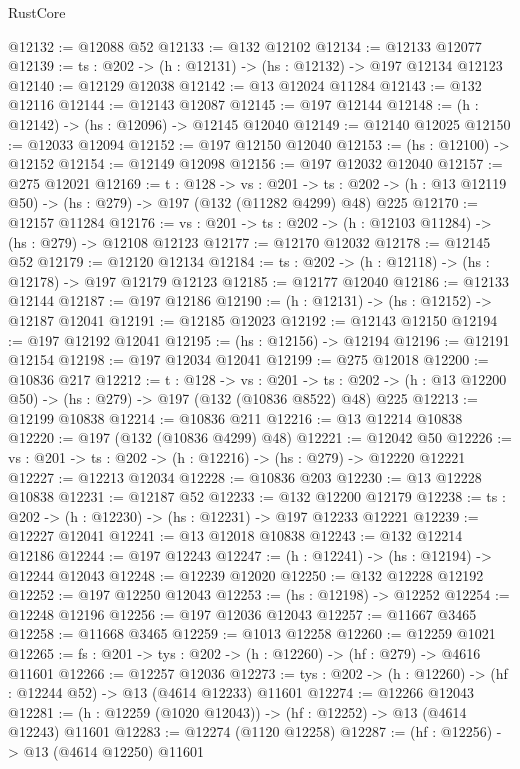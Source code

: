 \begin{lexlean}{RustCore}
\begin{coremodule}
@12132 := @12088 @52
@12133 := @132 @12102
@12134 := @12133 @12077
@12139 := {ts : @202} -> (h : @12131) -> (hs : @12132) -> @197 @12134 @12123
@12140 := @12129 @12038
@12142 := @13 @12024 @11284
@12143 := @132 @12116
@12144 := @12143 @12087
@12145 := @197 @12144
@12148 := (h : @12142) -> (hs : @12096) -> @12145 @12040
@12149 := @12140 @12025
@12150 := @12033 @12094
@12152 := @197 @12150 @12040
@12153 := (hs : @12100) -> @12152
@12154 := @12149 @12098
@12156 := @197 @12032 @12040
@12157 := @275 @12021
@12169 := {t : @128} ->
  {vs : @201} ->
  {ts : @202} -> (h : @13 @12119 @50) -> (hs : @279) -> @197 (@132 (@11282 @4299) @48) @225
@12170 := @12157 @11284
@12176 := {vs : @201} -> {ts : @202} -> (h : @12103 @11284) -> (hs : @279) -> @12108 @12123
@12177 := @12170 @12032
@12178 := @12145 @52
@12179 := @12120 @12134
@12184 := {ts : @202} -> (h : @12118) -> (hs : @12178) -> @197 @12179 @12123
@12185 := @12177 @12040
@12186 := @12133 @12144
@12187 := @197 @12186
@12190 := (h : @12131) -> (hs : @12152) -> @12187 @12041
@12191 := @12185 @12023
@12192 := @12143 @12150
@12194 := @197 @12192 @12041
@12195 := (hs : @12156) -> @12194
@12196 := @12191 @12154
@12198 := @197 @12034 @12041
@12199 := @275 @12018
@12200 := @10836 @217
@12212 := {t : @128} ->
  {vs : @201} ->
  {ts : @202} -> (h : @13 @12200 @50) -> (hs : @279) -> @197 (@132 (@10836 @8522) @48) @225
@12213 := @12199 @10838
@12214 := @10836 @211
@12216 := @13 @12214 @10838
@12220 := @197 (@132 (@10836 @4299) @48)
@12221 := @12042 @50
@12226 := {vs : @201} -> {ts : @202} -> (h : @12216) -> (hs : @279) -> @12220 @12221
@12227 := @12213 @12034
@12228 := @10836 @203
@12230 := @13 @12228 @10838
@12231 := @12187 @52
@12233 := @132 @12200 @12179
@12238 := {ts : @202} -> (h : @12230) -> (hs : @12231) -> @197 @12233 @12221
@12239 := @12227 @12041
@12241 := @13 @12018 @10838
@12243 := @132 @12214 @12186
@12244 := @197 @12243
@12247 := (h : @12241) -> (hs : @12194) -> @12244 @12043
@12248 := @12239 @12020
@12250 := @132 @12228 @12192
@12252 := @197 @12250 @12043
@12253 := (hs : @12198) -> @12252
@12254 := @12248 @12196
@12256 := @197 @12036 @12043
@12257 := @11667 @3465
@12258 := @11668 @3465
@12259 := @1013 @12258
@12260 := @12259 @1021
@12265 := {fs : @201} -> {tys : @202} -> (h : @12260) -> (hf : @279) -> @4616 @11601
@12266 := @12257 @12036
@12273 := {tys : @202} -> (h : @12260) -> (hf : @12244 @52) -> @13 (@4614 @12233) @11601
@12274 := @12266 @12043
@12281 := (h : @12259 (@1020 @12043)) -> (hf : @12252) -> @13 (@4614 @12243) @11601
@12283 := @12274 (@1120 @12258)
@12287 := (hf : @12256) -> @13 (@4614 @12250) @11601

\end{coremodule}
\end{lexlean}
